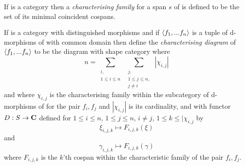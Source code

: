 \documentclass[10pt,a4paper]{scrartcl}
\begin{document}
\begin{definition}
\noindent If  is a category  then a \textit{characterising family} for a span $s$ of  is defined to be the set of its minimal coincident cospans.
\end{definition}


\noindent 

\begin{definition}
If  is a category with distinguished morphisms 
and if $\left\langle f_1,...f_n\right\rangle$ is a tuple of d-morphisms of  
with common domain then define the \textit{characterising diagram} of 
$\left\langle f_1,...f_n\right\rangle$
to be the diagram with shape category \ndidly where 
$$n = 
\sum_{\substack{i,\\1 \leq i \leq n}} \  \sum_{\substack{j,\\ 1 \leq j \leq n,\\ j \neq i}} \ | \chi_{i,j} | $$
and where $\chi_{i,j}$ is the characterising family within the subcategory 
of d-morphisms of  for the pair $f_i,f_j$ and 
$|\chi_{i,j}|$ is its cardinality,
and with functor $D: S \rightarrow \textbf{C}$ defined for $1 \leq i \leq n$, $1 \leq j \leq n$, $i \neq j$, $1 \leq k \leq | \chi_{i,j}$ by
$$ \xi_{i,j,k}   \mapsto F_{i,j,k}(\xi)$$
and
$$ \gamma_{i,j,k}   \mapsto F_{i,j,k}(\gamma) $$
where $F_{i,j,k}$ is the $k$'th cospan within the characteristic family of the pair $f_i,f_j$.
\end{definition}
\end{document}
